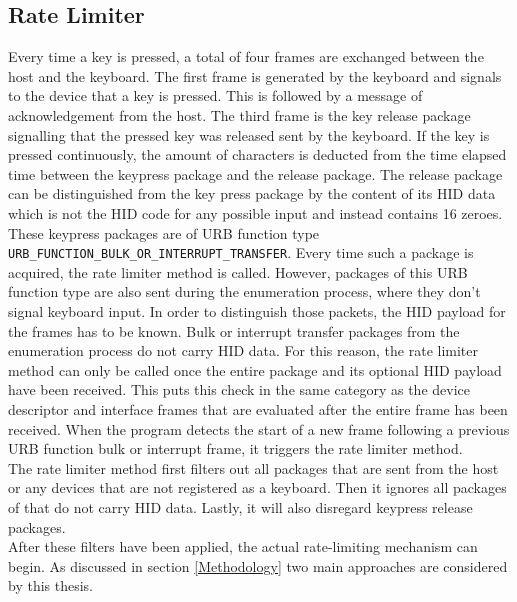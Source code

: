 \subsection{Rate Limiter}

Every time a key is pressed, a total of four frames are exchanged between the host and the keyboard. The first frame is generated by the keyboard and signals to the device that a key is pressed. This is followed by a message of acknowledgement from the host. The third frame is the key release package signalling that the pressed key was released sent by the keyboard. If the key is pressed continuously, the amount of characters is deducted from the time elapsed time between the keypress package and the release package. The release package can be distinguished from the key press package by the content of its HID data which is not the HID code for any possible input and instead contains 16 zeroes. \\
These keypress packages are of URB function type \verb|URB_FUNCTION_BULK_OR_INTERRUPT_TRANSFER|. Every time such a package is acquired, the rate limiter method is called. However, packages of this URB function type are also sent during the enumeration process, where they don't signal keyboard input. In order to distinguish those packets, the HID payload for the frames has to be known. Bulk or interrupt transfer packages from the enumeration process do not carry HID data. For this reason, the rate limiter method can only be called once the entire package and its optional HID payload have been received. This puts this check in the same category as the device descriptor and interface frames that are evaluated after the entire frame has been received. When the program detects the start of a new frame following a previous URB function bulk or interrupt frame, it triggers the rate limiter method. \\
The rate limiter method first filters out all packages that are sent from the host or any devices that are not registered as a keyboard. Then it ignores all packages of that do not carry HID data. Lastly, it will also disregard keypress release packages. \\

After these filters have been applied, the actual rate-limiting mechanism can begin. As discussed in section \ref{Methodology} two main approaches are considered by this thesis. \\


